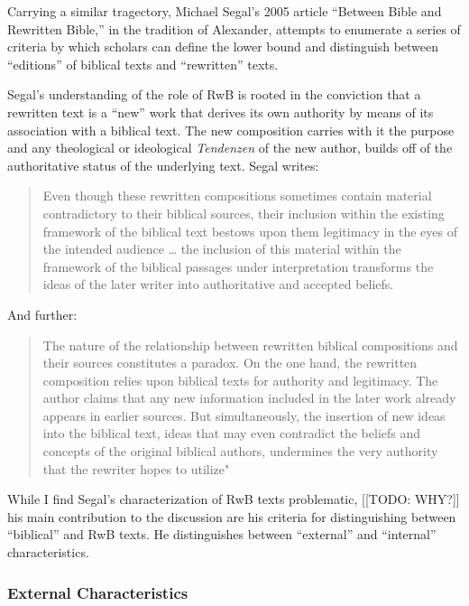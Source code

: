 Carrying a similar tragectory, Michael Segal's 2005 article ``Between Bible and Rewritten Bible,'' in the tradition of Alexander, attempts to enumerate a series of criteria by which scholars can define the lower bound and distinguish between ``editions'' of biblical texts and ``rewritten'' texts. 

Segal's understanding of the role of RwB is rooted in the conviction that a rewritten text is a ``new'' work that derives its own authority by means of its association with a biblical text. The new composition carries with it the purpose and any theological or ideological \emph{Tendenzen} of the new author, builds off of the authoritative status of the underlying text.\autocite[11]{segal_henze2005} Segal writes: 

\begin{quote}
    Even though these rewritten compositions sometimes contain material contradictory to their biblical sources, their inclusion within the existing framework of the biblical text bestows upon them legitimacy in the eyes of the intended audience \ldots{} the inclusion of this material within the framework of the biblical passages under interpretation transforms the ideas of the later writer into authoritative and accepted beliefs.\autocite[11]{segal_henze2005}
\end{quote} 

 And further: 

\begin{quote}
    The nature of the relationship between rewritten biblical compositions and their sources constitutes a paradox. On the one hand, the rewritten composition relies upon biblical texts for authority and legitimacy. The author claims that any new information included in the later work already appears in earlier sources. But simultaneously, the insertion of new ideas into the biblical text, ideas that may even contradict the beliefs and concepts of the original biblical authors, undermines the very authority that the rewriter hopes to utilize"\autocite[11-12]{segal_henze2005}
\end{quote} 

While I find Segal's characterization of RwB texts problematic, [[TODO: WHY?]] his main contribution to the discussion are his criteria for distinguishing between ``biblical'' and RwB texts. He distinguishes between ``external'' and ``internal'' characteristics. 

\subsubsection{External Characteristics}

